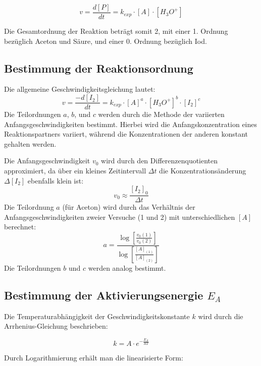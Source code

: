 \begin{equation}
   v = \frac{d[P]}{dt} = k_{exp} \cdot [A] \cdot [H_3O^+]
\end{equation}

Die Gesamtordnung der Reaktion beträgt somit 2, mit einer 1. Ordnung bezüglich Aceton und Säure, und einer 0. Ordnung bezüglich Iod.

\subsection{Bestimmung der Reaktionsordnung}
Die allgemeine Geschwindigkeitsgleichung lautet:
\begin{equation}
    v = \frac{-d[I_2]}{dt} = k_{exp} \cdot [A]^{a} \cdot [H_3O^{+}]^{b} \cdot [I_2]^{c}
\end{equation}
Die Teilordnungen $a$, $b$, und $c$ werden durch die Methode der variierten Anfangsgeschwindigkeiten bestimmt. 
Hierbei wird die Anfangskonzentration eines Reaktionspartners variiert, während die Konzentrationen der anderen konstant gehalten werden.

Die Anfangsgeschwindigkeit $v_0$ wird durch den Differenzenquotienten approximiert, da über ein kleines Zeitintervall $\Delta t$ die Konzentrationsänderung $\Delta [I_2]$ ebenfalls klein ist:
\begin{equation}
    v_0 \approx \frac{[I_2]_0}{\Delta t} \label{eqn:anfangsgeschwindigkeit}
\end{equation}
Die Teilordnung $a$ (für Aceton) wird durch das Verhältnis der Anfangsgeschwindigkeiten zweier Versuche (1 und 2) mit unterschiedlichen $[A]$ berechnet:
\begin{equation}
    a = \frac{\log \left[\frac{v_0(1)}{v_0(2)}\right]}{\log \left[\frac{[A]_{(1)}}{[A]_{(2)}}\right]} \label{eqn:teilordnung}
\end{equation}
Die Teilordnungen $b$ und $c$ werden analog bestimmt.

\subsection{Bestimmung der Aktivierungsenergie $E_A$}
Die Temperaturabhängigkeit der Geschwindigkeitskonstante $k$ wird durch die Arrhenius-Gleichung beschrieben:

\begin{equation}
k = A \cdot e^{-\frac{E_A}{R T}}
\end{equation}

Durch Logarithmierung erhält man die linearisierte Form:


